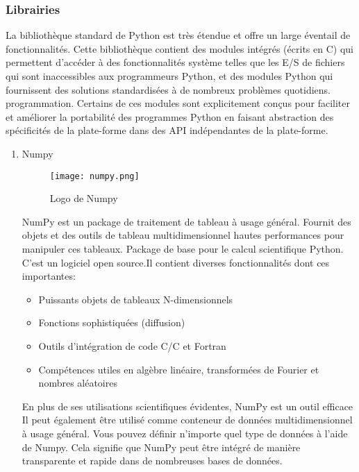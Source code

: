     \subsubsection{Librairies}
    La bibliothèque standard de Python est très étendue et offre un large éventail de fonctionnalités. Cette bibliothèque contient des modules intégrés (écrits en C) qui permettent d'accéder à des fonctionnalités  système telles que les E/S de fichiers qui sont inaccessibles aux programmeurs Python, et des modules  Python qui fournissent des solutions standardisées à de nombreux problèmes quotidiens. programmation. Certains de ces modules sont explicitement conçus pour faciliter et améliorer la portabilité des programmes Python en faisant abstraction des spécificités de la plate-forme dans des API indépendantes de la plate-forme.
    \begin{enumerate}\bfseries
        \item Numpy
        \begin{figure}[H]
            \centering
            \texttt{[image: numpy.png]}
            \caption{Logo de Numpy}\label{fig:numpy}
        \end{figure}
        \normalfont
        NumPy est un package de traitement de tableau à usage général. Fournit des objets et des outils de tableau multidimensionnel hautes performances  pour manipuler ces tableaux. Package de base pour le calcul scientifique  Python. C'est un logiciel open source.Il contient diverses fonctionnalités dont ces importantes:
        \begin{itemize}[label=$\bullet$]
            \item Puissants objets de tableaux N-dimensionnels 
            \item Fonctions sophistiquées (diffusion)
            \item Outils d'intégration de code C/C et Fortran
            \item Compétences utiles en algèbre linéaire, transformées de Fourier et nombres aléatoires
        \end{itemize}  
        
        En plus de ses utilisations scientifiques évidentes, NumPy est un outil efficace Il peut également être utilisé comme  conteneur de données  multidimensionnel à usage général. Vous pouvez définir n'importe quel type de données  à l'aide de Numpy. Cela signifie que NumPy peut être intégré de manière transparente et rapide dans de nombreuses bases de données.


\end{enumerate}

